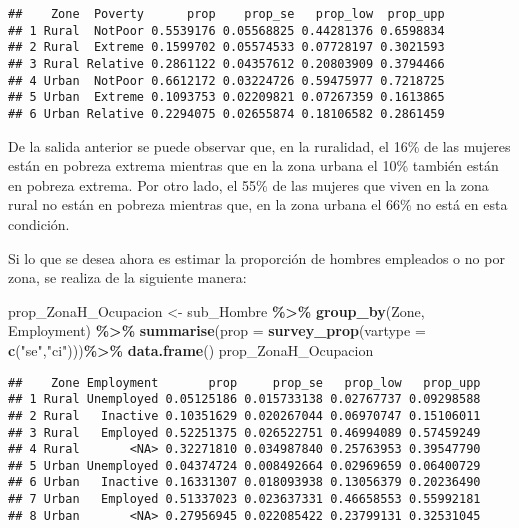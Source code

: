 \documentclass[
  12pt,
]{book}
\newenvironment{Shaded}{\begin{snugshade}}{\end{snugshade}}
\newcommand{\AttributeTok}[1]{\textcolor[rgb]{0.13,0.29,0.53}{#1}}
\newcommand{\FunctionTok}[1]{\textcolor[rgb]{0.13,0.29,0.53}{\textbf{#1}}}
\newcommand{\NormalTok}[1]{#1}
\newcommand{\OtherTok}[1]{\textcolor[rgb]{0.56,0.35,0.01}{#1}}
\newcommand{\SpecialCharTok}[1]{\textcolor[rgb]{0.81,0.36,0.00}{\textbf{#1}}}
\newcommand{\StringTok}[1]{\textcolor[rgb]{0.31,0.60,0.02}{#1}}
\begin{document}
\begin{verbatim}
##    Zone  Poverty      prop    prop_se   prop_low  prop_upp
## 1 Rural  NotPoor 0.5539176 0.05568825 0.44281376 0.6598834
## 2 Rural  Extreme 0.1599702 0.05574533 0.07728197 0.3021593
## 3 Rural Relative 0.2861122 0.04357612 0.20803909 0.3794466
## 4 Urban  NotPoor 0.6612172 0.03224726 0.59475977 0.7218725
## 5 Urban  Extreme 0.1093753 0.02209821 0.07267359 0.1613865
## 6 Urban Relative 0.2294075 0.02655874 0.18106582 0.2861459
\end{verbatim}

De la salida anterior se puede observar que, en la ruralidad, el 16\% de las mujeres están en pobreza extrema mientras que en la zona urbana el 10\% también están en pobreza extrema. Por otro lado, el 55\% de las mujeres que viven en la zona rural no están en pobreza mientras que, en la zona urbana el 66\% no está en esta condición.

Si lo que se desea ahora es estimar la proporción de hombres empleados o no por zona, se realiza de la siguiente manera:

\begin{Shaded}
\begin{Highlighting}[]
\NormalTok{prop\_ZonaH\_Ocupacion }\OtherTok{\textless{}{-}}\NormalTok{ sub\_Hombre }\SpecialCharTok{\%\textgreater{}\%}
                        \FunctionTok{group\_by}\NormalTok{(Zone, Employment) }\SpecialCharTok{\%\textgreater{}\%} 
                        \FunctionTok{summarise}\NormalTok{(}\AttributeTok{prop =} \FunctionTok{survey\_prop}\NormalTok{(}\AttributeTok{vartype =} \FunctionTok{c}\NormalTok{(}\StringTok{"se"}\NormalTok{,}\StringTok{"ci"}\NormalTok{)))}\SpecialCharTok{\%\textgreater{}\%}
                        \FunctionTok{data.frame}\NormalTok{()}
\NormalTok{prop\_ZonaH\_Ocupacion}
\end{Highlighting}
\end{Shaded}

\begin{verbatim}
##    Zone Employment       prop     prop_se   prop_low   prop_upp
## 1 Rural Unemployed 0.05125186 0.015733138 0.02767737 0.09298588
## 2 Rural   Inactive 0.10351629 0.020267044 0.06970747 0.15106011
## 3 Rural   Employed 0.52251375 0.026522751 0.46994089 0.57459249
## 4 Rural       <NA> 0.32271810 0.034987840 0.25763953 0.39547790
## 5 Urban Unemployed 0.04374724 0.008492664 0.02969659 0.06400729
## 6 Urban   Inactive 0.16331307 0.018093938 0.13056379 0.20236490
## 7 Urban   Employed 0.51337023 0.023637331 0.46658553 0.55992181
## 8 Urban       <NA> 0.27956945 0.022085422 0.23799131 0.32531045
\end{verbatim}
\end{document}
